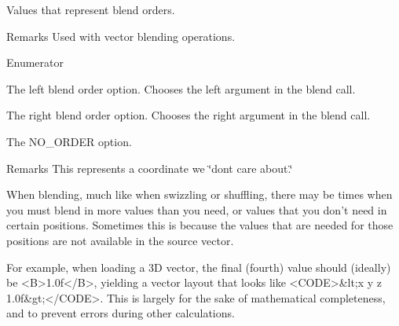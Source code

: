 Values that represent blend orders. 

\begin{DoxyRemark}{Remarks}
Used with vector blending operations. 
\end{DoxyRemark}
\begin{Desc}
\item[Enumerator]\par
\begin{description}
\item[{\em 
\hypertarget{namespacegofxmath_a2dce5f39d4af2a18b930b7eee34e034fab28013e6e287ee6b2890c0809dc4eb50}{}L\+E\+F\+T\label{namespacegofxmath_a2dce5f39d4af2a18b930b7eee34e034fab28013e6e287ee6b2890c0809dc4eb50}
}]The left blend order option. Chooses the left argument in the blend call. \item[{\em 
\hypertarget{namespacegofxmath_a2dce5f39d4af2a18b930b7eee34e034fa3949eb6190e4e02933ded246a5d8fb11}{}R\+I\+G\+H\+T\label{namespacegofxmath_a2dce5f39d4af2a18b930b7eee34e034fa3949eb6190e4e02933ded246a5d8fb11}
}]The right blend order option. Chooses the right argument in the blend call. \item[{\em 
\hypertarget{namespacegofxmath_a2dce5f39d4af2a18b930b7eee34e034fa6fd5e4e8e4bb7db4dd9086e8a5e313a4}{}N\+O\+\_\+\+O\+R\+D\+E\+R\label{namespacegofxmath_a2dce5f39d4af2a18b930b7eee34e034fa6fd5e4e8e4bb7db4dd9086e8a5e313a4}
}]The N\+O\+\_\+\+O\+R\+D\+E\+R option. \begin{DoxyRemark}{Remarks}
This represents a coordinate we \char`\"{}don\textquotesingle{}t care about.\char`\"{} \begin{DoxyVerb}           When blending, much like when swizzling or shuffling, there may be times when you must blend in
           more values than you need, or values that you don't need in certain positions.  Sometimes this is
           because the values that are needed for those positions are not available in the source vector.

           For example, when loading a 3D vector, the final (fourth) value should (ideally) be <B>1.0f</B>,
           yielding a vector layout that looks like <CODE>&lt;x y z 1.0f&gt;</CODE>.
           This is largely for the sake of mathematical completeness, and to prevent errors during other calculations.


\end{DoxyVerb}
\end{DoxyRemark}
\end{description}
\end{Desc}
